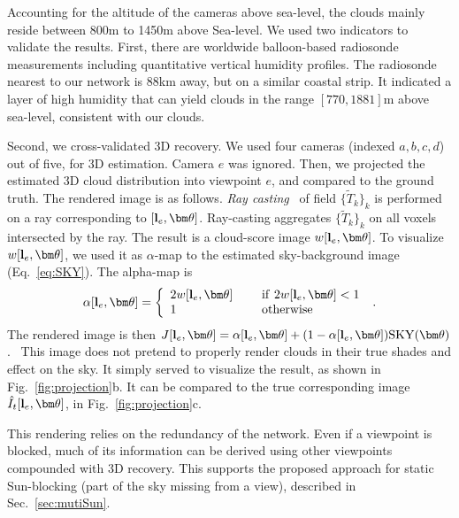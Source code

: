 \documentclass[runningheads]{llncs}
\begin{document}
Accounting for the altitude of the cameras above sea-level, the clouds mainly reside between 800m to 1450m above Sea-level. We used two indicators to validate the results. First, there are worldwide balloon-based radiosonde measurements including quantitative vertical humidity profiles. The radiosonde nearest to our network is 88km away, but on a similar coastal strip. It indicated a layer of high humidity that can yield clouds in the range $[770,1881]$m above sea-level, consistent with our clouds.

Second, we cross-validated 3D recovery. We used four cameras (indexed $a,b,c,d$) out of five, for 3D estimation. Camera $e$ was ignored. Then, we projected the estimated 3D cloud distribution into viewpoint $e$, and compared to the ground truth. The rendered image is as follows. {\em Ray casting}~\cite{Levoy1990} of  field $\{\tilde T_k\}_k$ is performed on a ray corresponding to
$[{\bf l}_e,{\bm \theta}]$. Ray-casting aggregates $\{\tilde T_k\}_k$ on all voxels intersected by the ray. The result is a cloud-score image $w[{\bf l}_e,{\bm \theta}]$.
To visualize $w[{\bf l}_e,{\bm \theta}]$, we used it as $\alpha$-map to the estimated sky-background image (Eq.~\ref{eq:SKY}). The alpha-map is
\begin{equation}
 \alpha[{\bf l}_e,{\bm \theta}]=\left\{
      \begin{array}{ll}
      2w[{\bf l}_e,{\bm \theta}]
      & ~~~~{\rm if}~ 2w[{\bf l}_e,{\bm \theta}]<1 \\
      1
      & ~~~~{\rm otherwise}
      \end{array}
      \right.
  \;.
 \label{eq:alpha}
\end{equation}
The rendered image is then
 $J[{\bf l}_e,{\bm \theta}]=
 \alpha[{\bf l}_e,{\bm \theta}]+(1-\alpha[{\bf l}_e,{\bm \theta}]){\rm SKY}({\bm \theta})$.~
This image does not pretend to properly render clouds in their true shades and effect on the sky. It simply served to visualize the result, as shown in Fig.~\ref{fig:projection}b. It can be compared to the true corresponding image $\hat I_t[{\bf l}_e,{\bm \theta}]$, in Fig.~\ref{fig:projection}c.

This rendering relies on the redundancy of the network. Even if a viewpoint is blocked, much of its information can be derived using other viewpoints compounded with 3D recovery. This supports the proposed approach for static Sun-blocking (part of the sky missing from a view), described in Sec.~\ref{sec:mutiSun}.
\end{document}
